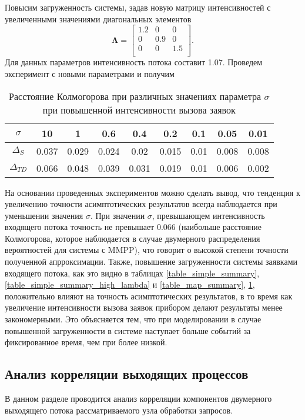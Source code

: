 Повысим загруженность системы, задав новую матрицу интенсивностей с увеличенными значениями диагональных элементов 
 \begin{equation*}
	\boldsymbol{\Lambda}=\begin{bmatrix}
		1.2 &	0 & 0\\
		0 &	0.9 & 0\\
		0 &	0 & 1.5\\
	\end{bmatrix}.
\end{equation*}
Для данных параметров интенсивность потока составит 1.07. Проведем эксперимент с новыми параметрами и получим
\clearpage
\begin{table}[htb!] 
	\centering
	\caption{Расстояние Колмогорова при различных значениях параметра $\sigma$ при повышенной интенсивности вызова заявок}
	\label{table_map_summary_high_lambda}
	\begin{tabular}{| c | c | c | c | c | c | c | c | c |}
		\hline
		$\sigma$ & 10 & 1 & 0.6 & 0.4 & 0.2 & 0.1 & 0.05 & 0.01 \\ 
		\hline
		$\Delta_S$ & 0.037 & 0.029 & 0.024 & 0.02 & 0.015 & 0.01 & 0.008 & 0.008\\
		\hline
		$\Delta_{TD}$ & 0.066 & 0.048 & 0.039 & 0.031 & 0.019 & 0.01 & 0.006 & 0.002\\
		\hline
	\end{tabular}
\end{table}

На основании проведенных экспериментов можно сделать вывод, что тенденция к увеличению точности асимптотических результатов всегда наблюдается при уменьшении значения $\sigma$. При  значении $\sigma$, превышающем интенсивность входящего потока точность не превышает 0.066 (наибольше расстояние Колмогорова, которое наблюдается в случае двумерного распределения вероятностей для системы с MMPP), что говорит о высокой степени точности полученной апрроксимации. Также, повышение загруженности системы заявками входящего потока, как это видно в таблицах \ref{table_simple_summary}, \ref{table_simple_summary_high_lambda} и \ref{table_map_summary}, \ref{table_map_summary_high_lambda}, положительно влияют на точность асимптотических результатов, в то время как увеличение интенсивности вызова заявок прибором делают результаты менее закономерными. Это объясняется тем, что при моделировании в случае повышенной загруженности в системе наступает больше событий за фиксированное время, чем при более низкой.

\subsection{Анализ корреляции выходящих процессов}
В данном разделе проводится анализ корреляции компонентов двумерного выходящего потока рассматриваемого узла обработки запросов.

